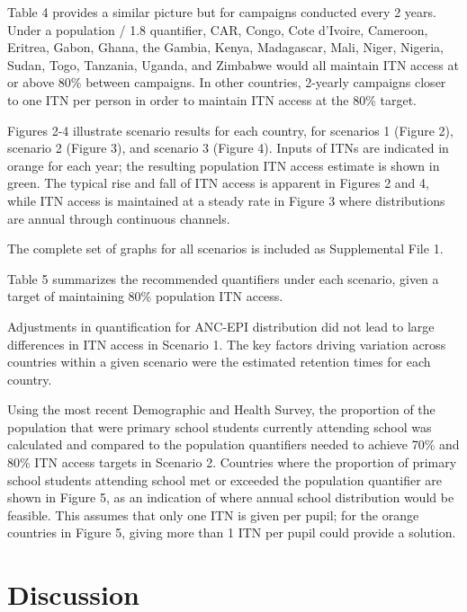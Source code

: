 \documentclass[review,
3p]{elsarticle} %
\begin{document}
Table 4 provides a similar picture but for campaigns conducted every 2
years. Under a population / 1.8 quantifier, CAR, Congo, Cote d'Ivoire,
Cameroon, Eritrea, Gabon, Ghana, the Gambia, Kenya, Madagascar, Mali,
Niger, Nigeria, Sudan, Togo, Tanzania, Uganda, and Zimbabwe would all
maintain ITN access at or above 80\% between campaigns. In other
countries, 2-yearly campaigns closer to one ITN per person in order to
maintain ITN access at the 80\% target.

Figures 2-4 illustrate scenario results for each country, for scenarios
1 (Figure 2), scenario 2 (Figure 3), and scenario 3 (Figure 4). Inputs
of ITNs are indicated in orange for each year; the resulting population
ITN access estimate is shown in green. The typical rise and fall of ITN
access is apparent in Figures 2 and 4, while ITN access is maintained at
a steady rate in Figure 3 where distributions are annual through
continuous channels.

The complete set of graphs for all scenarios is included as Supplemental
File 1.

Table 5 summarizes the recommended quantifiers under each scenario,
given a target of maintaining 80\% population ITN access.

Adjustments in quantification for ANC-EPI distribution did not lead to
large differences in ITN access in Scenario 1. The key factors driving
variation across countries within a given scenario were the estimated
retention times for each country.

Using the most recent Demographic and Health Survey, the proportion of
the population that were primary school students currently attending
school was calculated and compared to the population quantifiers needed
to achieve 70\% and 80\% ITN access targets in Scenario 2. Countries
where the proportion of primary school students attending school met or
exceeded the population quantifier are shown in Figure 5, as an
indication of where annual school distribution would be feasible. This
assumes that only one ITN is given per pupil; for the orange countries
in Figure 5, giving more than 1 ITN per pupil could provide a solution.

\hypertarget{discussion}{%
\section{Discussion}\label{discussion}}
\end{document}
